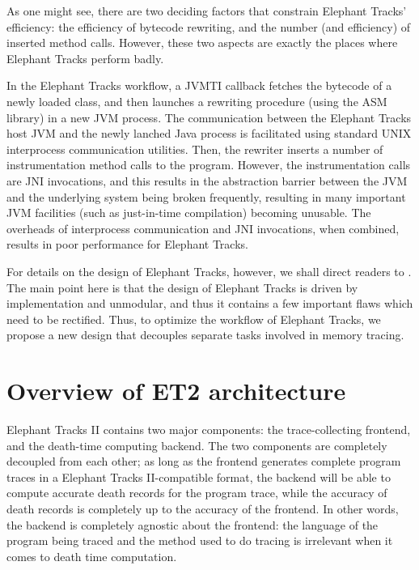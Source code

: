 As one might see, there are two deciding factors that constrain Elephant Tracks' efficiency: the efficiency
of bytecode rewriting, and the number (and efficiency) of inserted method calls. However, these two aspects
are exactly the places where Elephant Tracks perform badly.

In the Elephant Tracks workflow, a JVMTI callback fetches the bytecode of a newly loaded class, and then launches
a rewriting procedure (using the ASM library) in a new JVM process. The communication between the Elephant Tracks
host JVM and the newly lanched Java process is facilitated using standard UNIX interprocess communication utilities.
Then, the rewriter inserts a number of instrumentation method calls to the program. However, the instrumentation calls
are JNI invocations, and this results in the abstraction barrier between the JVM and the underlying system being broken
frequently, resulting in many important JVM facilities (such as just-in-time compilation) becoming unusable. The overheads of
interprocess communication and JNI invocations, when combined, results in poor performance for Elephant Tracks.

For details on the design of Elephant Tracks, however, we shall direct readers to \cite{ElephantTracks}. The main point here is
that the design of Elephant Tracks is driven by implementation and unmodular, and thus it contains a few important flaws which
need to be rectified. Thus, to optimize the workflow of Elephant Tracks, we propose a new design that decouples separate tasks
involved in memory tracing.

\section{Overview of ET2 architecture}
Elephant Tracks II contains two major components: the trace-collecting frontend, and the death-time computing backend. The two
components are completely decoupled from each other; as long as the frontend generates complete program traces in a 
Elephant Tracks II-compatible format, the backend will be able to compute accurate death records for the program trace, while the
accuracy of death records is completely up to the accuracy of the frontend. In other words, the backend is completely agnostic
about the frontend: the language of the program being traced and the method used to do tracing is irrelevant when it comes to
death time computation.

